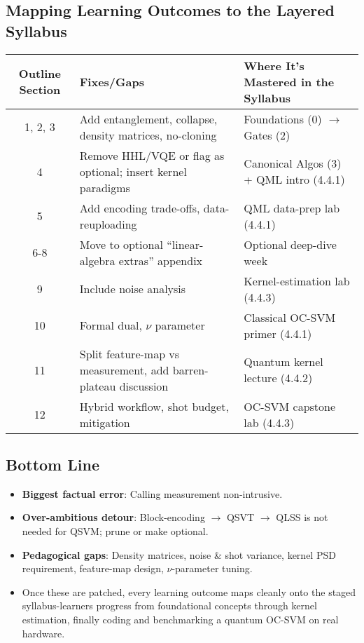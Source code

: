 \documentclass[11pt,a4paper]{article}
\begin{document}
	\subsection{Mapping Learning Outcomes to the Layered Syllabus}
	\begin{longtable}{|c|l|l|}
		\hline
		\textbf{Outline Section} & \textbf{Fixes/Gaps} & \textbf{Where It’s Mastered in the Syllabus} \\
		\hline
		1, 2, 3 & Add entanglement, collapse, density matrices, no-cloning & Foundations (0) $\rightarrow$ Gates (2) \\
		\hline
		4 & Remove HHL/VQE or flag as optional; insert kernel paradigms & Canonical Algos (3) + QML intro (4.4.1) \\
		\hline
		5 & Add encoding trade-offs, data-reuploading & QML data-prep lab (4.4.1) \\
		\hline
		6-8 & Move to optional “linear-algebra extras” appendix & Optional deep-dive week \\
		\hline
		9 & Include noise analysis & Kernel-estimation lab (4.4.3) \\
		\hline
		10 & Formal dual, $\nu$ parameter & Classical OC-SVM primer (4.4.1) \\
		\hline
		11 & Split feature-map vs measurement, add barren-plateau discussion & Quantum kernel lecture (4.4.2) \\
		\hline
		12 & Hybrid workflow, shot budget, mitigation & OC-SVM capstone lab (4.4.3) \\
		\hline
	\end{longtable}
	
	\subsection{Bottom Line}
	\begin{itemize}
		\item \textbf{Biggest factual error}: Calling measurement non-intrusive.
		\item \textbf{Over-ambitious detour}: Block-encoding $\rightarrow$ QSVT $\rightarrow$ QLSS is not needed for QSVM; prune or make optional.
		\item \textbf{Pedagogical gaps}: Density matrices, noise \& shot variance, kernel PSD requirement, feature-map design, $\nu$-parameter tuning.
		\item Once these are patched, every learning outcome maps cleanly onto the staged syllabus-learners progress from foundational concepts through kernel estimation, finally coding and benchmarking a quantum OC-SVM on real hardware.
	\end{itemize}
\end{document}
